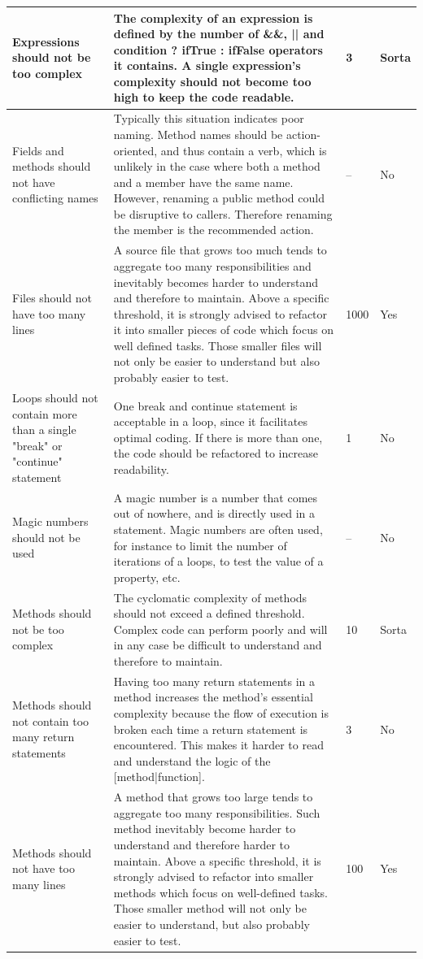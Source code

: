 \documentclass{article}
\begin{document}
\begin{longtable}{L{3cm}|L{8cm}|L{1cm}|L{1cm}}
\midrule
Expressions should not be  too complex & The complexity of an expression is defined by the number of \&\&, || and condition ? ifTrue : ifFalse operators it contains. A single expression's complexity should not become too high to keep the code readable. & 3 & Sorta \\
\midrule
Fields and methods should not have conflicting names & Typically this situation indicates poor naming. Method names should be action-oriented, and thus contain a verb, which is unlikely in the case where both a method and a member have the same name. However, renaming a public method could be disruptive to callers. Therefore renaming the member is the recommended action. & -- & No \\
\midrule
Files should not have too many lines & A source file that grows too much tends to aggregate too many responsibilities and inevitably becomes harder to understand and therefore to maintain. Above a specific threshold, it is strongly advised to refactor it into smaller pieces of code which focus on well defined tasks. Those smaller files will not only be easier to understand but also probably easier to test. & 1000 & Yes \\
\midrule
Loops should not contain more than a single "break" or "continue" statement & One break and continue statement is acceptable in a loop, since it facilitates optimal coding. If there is more than one, the code should be refactored to increase readability. & 1 & No \\
\midrule
Magic numbers should not be used & A magic number is a number that comes out of nowhere, and is directly used in a statement. Magic numbers are often used, for instance to limit the number of iterations of a loops, to test the value of a property, etc. & -- & No \\
\midrule
Methods should not be too complex & The cyclomatic complexity of methods should not exceed a defined threshold. Complex code can perform poorly and will in any case be difficult to understand and therefore to maintain. & 10 & Sorta \\
\midrule
Methods should not contain too many return statements & Having too many return statements in a method increases the method's essential complexity because the flow of execution is broken each time a return statement is encountered. This makes it harder to read and understand the logic of the [method|function]. & 3 & No \\
\midrule
Methods should not have too many lines & A method that grows too large tends to aggregate too many responsibilities. Such method inevitably become harder to understand and therefore harder to maintain. Above a specific threshold, it is strongly advised to refactor into smaller methods which focus on well-defined tasks. Those smaller method will not only be easier to understand, but also probably easier to test. & 100 & Yes \\

\end{longtable}
\end{document}

